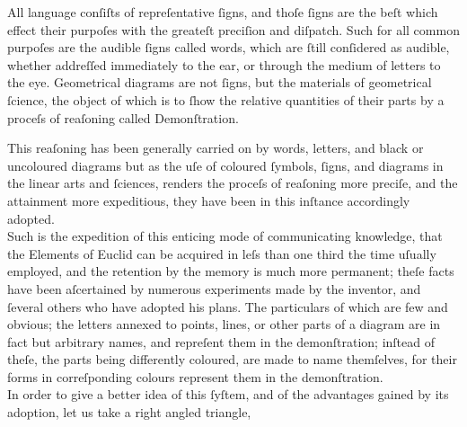 \begin{minipage}{0.80\textwidth}
    All language conſiſts of repreſentative ſigns, and thoſe ſigns are the beſt which effect their purpoſes with the greateſt preciſion and diſpatch. Such for all common purpoſes are the audible ſigns called words, which are ſtill conſidered as audible, whether addreſſed immediately to the ear, or through the medium of letters to the eye. Geometrical diagrams are not ſigns, but the materials of geometrical ſcience, the object of which is to ſhow the relative quantities of their parts by a proceſs of reaſoning called Demonſtration.

    This reaſoning has been generally carried on by words, letters, and black or uncoloured diagrams but as the uſe of coloured ſymbols, ſigns, and diagrams in the linear arts and ſciences, renders the proceſs of reaſoning more preciſe, and the attainment more expeditious, they have been in this inſtance accordingly adopted.\\

    Such is the expedition of this enticing mode of communicating knowledge, that the Elements of Euclid can be acquired in leſs than one third the time uſually employed, and the retention by the memory is much more permanent; theſe facts have been aſcertained by numerous experiments made by the inventor, and ſeveral others who have adopted his plans. The particulars of which are few and obvious; the letters annexed to points, lines, or other parts of a diagram are in fact but arbitrary names, and repreſent them in the demonſtration; inſtead of theſe, the parts being differently coloured, are made to name themſelves, for their forms in correſponding colours represent them in the demonſtration.\\

    In order to give a better idea of this ſyſtem, and of the advantages gained by its adoption, let us take a right angled triangle,
\end{minipage}

\newpage

